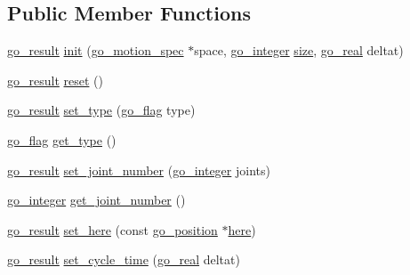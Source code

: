 \subsection*{Public Member Functions}
\begin{DoxyCompactItemize}
\item 
\hyperlink{gotypes_8h_a55d48b38cd959f63c7e8db8337a9792a}{go\-\_\-result} \hyperlink{structgomotion_1_1go__motion__queue_a23b5be5b838cf78eff17f8a7fa5df490}{init} (\hyperlink{structgomotion_1_1go__motion__spec}{go\-\_\-motion\-\_\-spec} $\ast$space, \hyperlink{gotypes_8h_a7d30f606bb0f58ffe2b3bd71e5c8af5c}{go\-\_\-integer} \hyperlink{structgomotion_1_1go__motion__queue_a9eb929528abd0d19d272110c67236dce}{size}, \hyperlink{gotypes_8h_afd666a2393eebd71ee455846ac9def9b}{go\-\_\-real} deltat)
\item 
\hyperlink{gotypes_8h_a55d48b38cd959f63c7e8db8337a9792a}{go\-\_\-result} \hyperlink{structgomotion_1_1go__motion__queue_a2eb9870461c0c071b2576c0071aebae7}{reset} ()
\item 
\hyperlink{gotypes_8h_a55d48b38cd959f63c7e8db8337a9792a}{go\-\_\-result} \hyperlink{structgomotion_1_1go__motion__queue_a7ecc32334fd878989a9c1aba2dd8f309}{set\-\_\-type} (\hyperlink{gotypes_8h_ae890d9a0ddecc0d3073622cc4312092d}{go\-\_\-flag} type)
\item 
\hyperlink{gotypes_8h_ae890d9a0ddecc0d3073622cc4312092d}{go\-\_\-flag} \hyperlink{structgomotion_1_1go__motion__queue_a29775f13e13d7ca216e416c87b14fcdb}{get\-\_\-type} ()
\item 
\hyperlink{gotypes_8h_a55d48b38cd959f63c7e8db8337a9792a}{go\-\_\-result} \hyperlink{structgomotion_1_1go__motion__queue_ac623c003c01542bea2151f38b622c67e}{set\-\_\-joint\-\_\-number} (\hyperlink{gotypes_8h_a7d30f606bb0f58ffe2b3bd71e5c8af5c}{go\-\_\-integer} joints)
\item 
\hyperlink{gotypes_8h_a7d30f606bb0f58ffe2b3bd71e5c8af5c}{go\-\_\-integer} \hyperlink{structgomotion_1_1go__motion__queue_ac2fcc83c90ccd7794d7407174eaf2b37}{get\-\_\-joint\-\_\-number} ()
\item 
\hyperlink{gotypes_8h_a55d48b38cd959f63c7e8db8337a9792a}{go\-\_\-result} \hyperlink{structgomotion_1_1go__motion__queue_a0580645d22f2db0893ccd1cc0271469d}{set\-\_\-here} (const \hyperlink{structgomotion_1_1go__position}{go\-\_\-position} $\ast$\hyperlink{structgomotion_1_1go__motion__queue_ab45a3644aac5d496e758db38a3553037}{here})
\item 
\hyperlink{gotypes_8h_a55d48b38cd959f63c7e8db8337a9792a}{go\-\_\-result} \hyperlink{structgomotion_1_1go__motion__queue_a560b24166fe53f8e2d8be6afaf08c7e9}{set\-\_\-cycle\-\_\-time} (\hyperlink{gotypes_8h_afd666a2393eebd71ee455846ac9def9b}{go\-\_\-real} deltat)

\end{DoxyCompactItemize}
